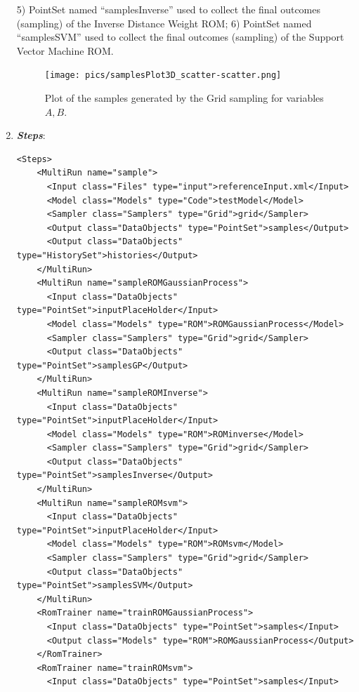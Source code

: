 \begin{enumerate}
  5) PointSet named ``samplesInverse'' used to collect the final outcomes (sampling) of the Inverse Distance Weight ROM;
  6) PointSet named ``samplesSVM'' used to collect the final outcomes (sampling) of the Support Vector Machine ROM.
 \begin{figure}[h!]
  \centering
  \texttt{[image: pics/samplesPlot3D\_scatter-scatter.png]}
  \caption{Plot of the samples generated by the Grid sampling for variables $A,B$.}
  \label{fig:ROMgrid_pointsets}
 \end{figure}
   \item \textbf{\textit{Steps}}:   
\begin{lstlisting}[style=XML,morekeywords={arg,extension,pauseAtEnd,overwrite}]
  <Steps>
    <MultiRun name="sample">
      <Input class="Files" type="input">referenceInput.xml</Input>
      <Model class="Models" type="Code">testModel</Model>
      <Sampler class="Samplers" type="Grid">grid</Sampler>
      <Output class="DataObjects" type="PointSet">samples</Output>
      <Output class="DataObjects" type="HistorySet">histories</Output>
    </MultiRun>
    <MultiRun name="sampleROMGaussianProcess">
      <Input class="DataObjects" type="PointSet">inputPlaceHolder</Input>
      <Model class="Models" type="ROM">ROMGaussianProcess</Model>
      <Sampler class="Samplers" type="Grid">grid</Sampler>
      <Output class="DataObjects" type="PointSet">samplesGP</Output>
    </MultiRun>
    <MultiRun name="sampleROMInverse">
      <Input class="DataObjects" type="PointSet">inputPlaceHolder</Input>
      <Model class="Models" type="ROM">ROMinverse</Model>
      <Sampler class="Samplers" type="Grid">grid</Sampler>
      <Output class="DataObjects" type="PointSet">samplesInverse</Output>
    </MultiRun>
    <MultiRun name="sampleROMsvm">
      <Input class="DataObjects" type="PointSet">inputPlaceHolder</Input>
      <Model class="Models" type="ROM">ROMsvm</Model>
      <Sampler class="Samplers" type="Grid">grid</Sampler>
      <Output class="DataObjects" type="PointSet">samplesSVM</Output>
    </MultiRun>
    <RomTrainer name="trainROMGaussianProcess">
      <Input class="DataObjects" type="PointSet">samples</Input>
      <Output class="Models" type="ROM">ROMGaussianProcess</Output>
    </RomTrainer>
    <RomTrainer name="trainROMsvm">
      <Input class="DataObjects" type="PointSet">samples</Input>

\end{lstlisting}
\end{enumerate}
